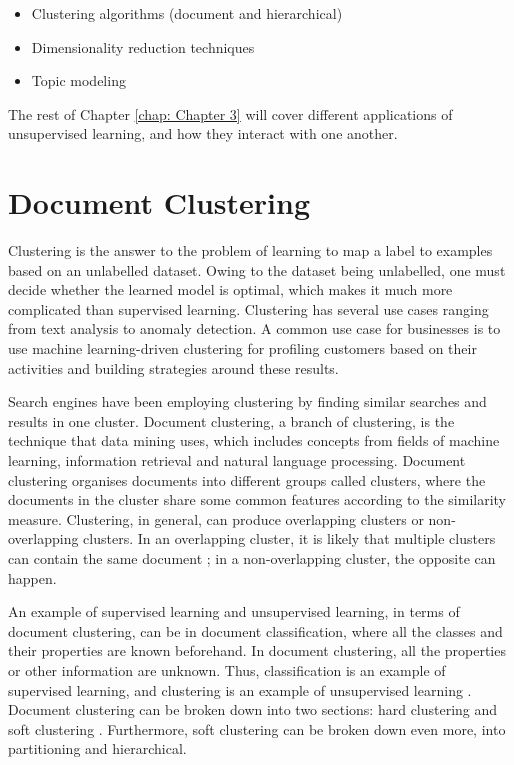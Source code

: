 \begin{itemize}
\item Clustering algorithms (document and hierarchical)
\item Dimensionality reduction techniques
\item Topic modeling
\end{itemize}

The rest of Chapter \ref{chap: Chapter 3} will cover different applications of unsupervised learning, and how they interact with one another.

\section{Document Clustering}

Clustering is the answer to the problem of learning to map a label to examples based on an unlabelled dataset. Owing to the dataset being unlabelled, one must decide whether the learned model is optimal, which makes it much more complicated than supervised learning. Clustering has several use cases ranging from text analysis to anomaly detection. A common use case for businesses is to use machine learning-driven clustering for profiling customers based on their activities and building strategies around these results.

Search engines have been employing clustering by finding similar searches and results in one cluster. Document clustering, a branch of clustering, is the technique that data mining uses, which includes concepts from fields of machine learning, information retrieval and natural language processing. Document clustering organises documents into different groups called clusters, where the documents in the cluster share some common features according to the similarity measure. Clustering, in general, can produce overlapping clusters or non-overlapping clusters. In an overlapping cluster, it is likely that multiple clusters can contain the same document \cite{andrews2007recent}; in a non-overlapping cluster, the opposite can happen.

An example of supervised learning and unsupervised learning, in terms of document clustering, can be in document classification, where all the classes and their properties are known beforehand. In document clustering, all the properties or other information are unknown. Thus, classification is an example of supervised learning, and clustering is an example of unsupervised learning \cite{andrews2007recent}.
Document clustering can be broken down into two sections: hard clustering and soft clustering \cite{chen2010integration}. Furthermore, soft clustering can be broken down even more, into partitioning and hierarchical.

